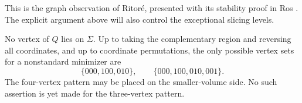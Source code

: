This is the graph observation of Ritor\'e, presented with its stability
proof in Ros \cite[Proposition~2.3]{Ros}. The explicit argument above
will also control the exceptional slicing levels.

\begin{proposition}\label{geo:patterns}
No vertex of \(Q\) lies on \(\Sigma\). Up to taking the complementary
region and reversing all coordinates, and up to coordinate permutations,
the only possible vertex sets for a nonstandard minimizer are
\begin{equation}
 \{000,100,010\},\qquad
 \{000,100,010,001\}.
 \label{geo:two-patterns}
\end{equation}
The four-vertex pattern may be placed on the smaller-volume side.
No such assertion is yet made for the three-vertex pattern.
\end{proposition}

